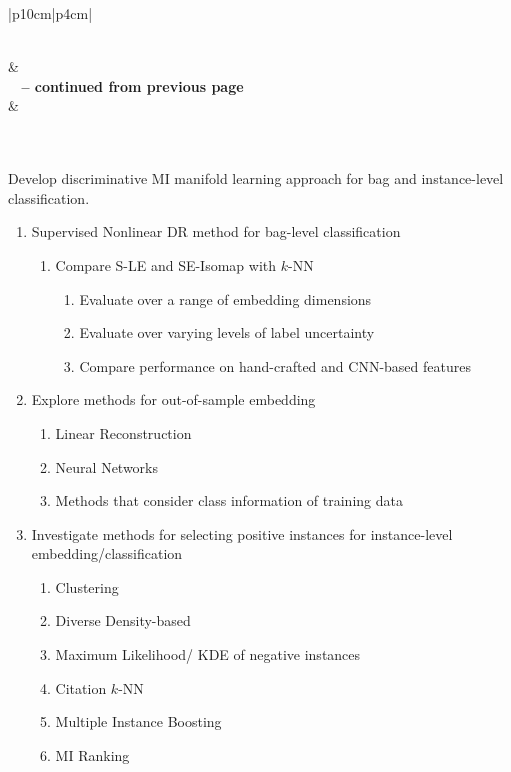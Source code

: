 \begin{longtable}{|p{10cm}|p{4cm}|} 
	\caption[List of Research Tasks]{List of research tasks and their corresponding estimated dates for completion.}
	\label{tab:future_tasks}\\
	\hline {} &  \\ \hline
	\endfirsthead
	{{\bfseries \tablename\ \thetable{} -- continued from previous page}} \\
	\hline {} &  
	\\
	\hline
	\endhead
	\hline {} \\ \hline
	\endfoot
	\hline \hline
	\endlastfoot


	 \\
	\hline
	Develop discriminative MI manifold learning approach for bag and instance-level classification. 
	\begin{enumerate}
		\item Supervised Nonlinear DR method for bag-level classification \label{item:supervisedDR_bag_level}
		\begin{enumerate}
			\item Compare S-LE and SE-Isomap  with $k$-NN
			\begin{enumerate}
				\item Evaluate over a range of embedding dimensions
				\item Evaluate over varying levels of label uncertainty
				\item Compare performance on hand-crafted and CNN-based features
			\end{enumerate}
		\end{enumerate}
	
		\item Explore methods for out-of-sample embedding
		\begin{enumerate}
			\item Linear Reconstruction
			\item Neural Networks
			\item Methods that consider class information of training data
		\end{enumerate}
		
		\item Investigate methods for selecting positive instances for instance-level  embedding/classification
		\begin{enumerate}
			\item Clustering
			\item Diverse Density-based
			\item Maximum Likelihood/ KDE of negative instances
			\item Citation $k$-NN
			\item Multiple Instance Boosting
			\item MI Ranking
		\end{enumerate}
	

\end{enumerate}
\end{longtable}
